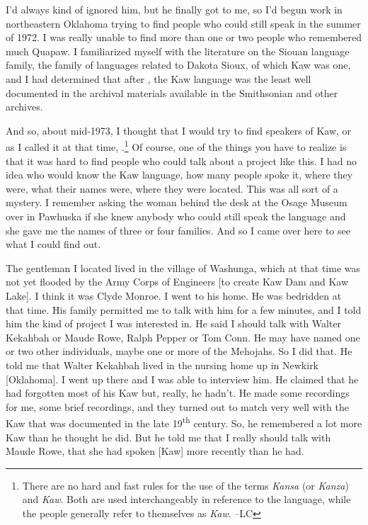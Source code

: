 \documentclass[output=paper]{LSP/langsci}
\begin{document}
I'd always kind of ignored him, but he finally got to me, so I'd begun work in northeastern Oklahoma trying to find people who could still speak  in the summer of 1972. I was really unable to find more than one or two people who remembered much Quapaw. I familiarized myself with the literature on the Siouan language family, the family of languages related to Dakota Sioux, of which Kaw was one, and I had determined that after , the Kaw language was the least well documented in the archival materials available in the Smithsonian and other archives. 

And so, about mid-1973, I thought that I would try to find speakers of Kaw, or as I called it at that time, .\footnote{There are no hard and fast rules for the use of the terms \textit{Kansa} (or \textit{Kanza}) and \textit{Kaw}. Both are used interchangeably in reference to the language, while the people generally refer to themselves as \textit{Kaw}. --LC} Of course, one of the things you have to realize is that it was hard to find people who could talk about a project like this. I had no idea who would know the Kaw language, how many people spoke it, where they were, what their names were, where they were located. This was all sort of a mystery. I remember asking the woman behind the desk at the Osage Museum over in Pawhuska if she knew anybody who could still speak the  language and she gave me the names of three or four families. And so I came over here to see what I could find out. 

The gentleman I located lived in the village of Washunga, which at that time was not yet flooded by the Army Corps of Engineers [to create Kaw Dam and Kaw Lake]. I think it was Clyde Monroe. I went to his home. He was bedridden at that time. His family permitted me to talk with him for a few minutes, and I told him the kind of project I was interested in. He said I should talk with Walter Kekahbah or Maude Rowe, Ralph Pepper or Tom Conn. He may have named one or two other individuals, maybe one or more of the Mehojahs. So I did that. He told me that Walter Kekahbah lived in the nursing home up in Newkirk [Oklahoma]. I went up there and I was able to interview him. He claimed that he had forgotten most of his Kaw but, really, he hadn't. He made some recordings for me, some brief recordings, and they turned out to match very well with the Kaw that was documented in the late 19\textsuperscript{th} century. So, he remembered a lot more Kaw than he thought he did. But he told me that I really should talk with Maude Rowe, that she had spoken [Kaw] more recently than he had. 
\end{document}
